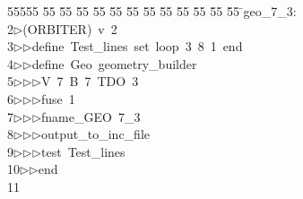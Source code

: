 %
%
\begin{tabbing}
55555 \= 55 \= 55 \= 55 \= 55 \= 55 \= 55 \= 55 \= 55 \= 55 \= 55 \= 55 \= 55 \= \>geo\_7\_3:\\[0pt]
2\>$\triangleright$\>(ORBITER)\ v\ 2\ \\[0pt]
3\>$\triangleright$\>$\triangleright$\>define\ Test\_lines\ set\ loop\ 3\ 8\ 1\ end\ \\[0pt]
4\>$\triangleright$\>$\triangleright$\>define\ Geo\ geometry\_builder\ \\[0pt]
5\>$\triangleright$\>$\triangleright$\>$\triangleright$\>V\ 7\ B\ 7\ TDO\ 3\ \\[0pt]
6\>$\triangleright$\>$\triangleright$\>$\triangleright$\>fuse\ 1\ \\[0pt]
7\>$\triangleright$\>$\triangleright$\>$\triangleright$\>fname\_GEO\ 7\_3\ \\[0pt]
8\>$\triangleright$\>$\triangleright$\>$\triangleright$\>output\_to\_inc\_file\ \\[0pt]
9\>$\triangleright$\>$\triangleright$\>$\triangleright$\>test\ Test\_lines\ \\[0pt]
10\>$\triangleright$\>$\triangleright$\>end\\[0pt]
11\>\end{tabbing}
